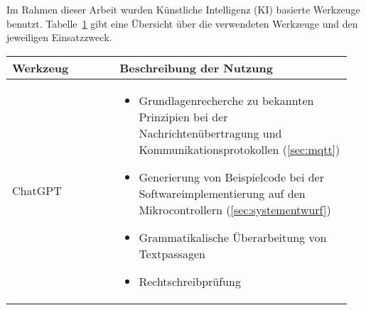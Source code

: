 \setcounter{chapter}{1}

Im Rahmen dieser Arbeit wurden Künstliche Intelligenz (KI) basierte Werkzeuge benutzt. Tabelle~\ref{tab:anhang_uebersicht_KI_werkzeuge} gibt eine Übersicht über die verwendeten Werkzeuge und den jeweiligen Einsatzzweck.

\begin{table}[hbt]	
	\centering
	\renewcommand{\arraystretch}{1.5}	%
	\label{tab:anhang_uebersicht_KI_werkzeuge}
	\begin{tabular}{>{\raggedright\arraybackslash}p{0.3\linewidth} >{\raggedright\arraybackslash}p{0.65\linewidth}}
		\textbf{Werkzeug} & \textbf{Beschreibung der Nutzung}\\
		\hline 
		\hline
		ChatGPT & 	\vspace{-\topsep}
					\begin{itemize}[noitemsep,topsep=0pt,partopsep=0pt,parsep=0pt] 
						\item Grundlagenrecherche zu bekannten Prinzipien bei der Nachrichtenübertragung und Kommunikationsprotokollen (\autoref{sec:mqtt})
						\item Generierung von Beispielcode bei der Softwareimplementierung auf den Mikrocontrollern (\autoref{sec:systementwurf})
						\item Grammatikalische Überarbeitung von
						Textpassagen
						\item Rechtschreibprüfung
				   	\end{itemize} \\
		\hline 
	\end{tabular} 
\end{table}

\setcounter{chapter}{2}


